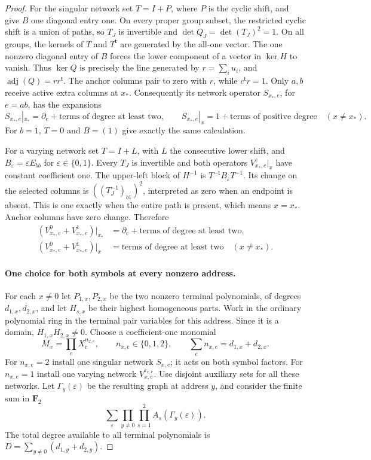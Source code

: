 \documentclass[11pt]{article}
\theoremstyle{definition}
\theoremstyle{remark}
\begin{document}
\begin{proof}
For the singular network set $T=I+P$, where $P$ is the cyclic shift,
and give $B$ one diagonal entry one.  On every proper group subset,
the restricted cyclic shift is a union of paths, so $T_J$ is
invertible and $\det Q_J=\det(T_J)^2=1$.  On all groups, the kernels
of $T$ and $T^{\mathsf t}$ are generated by the all-one vector.
The one nonzero diagonal entry of $B$ forces the lower component of
a vector in $\ker H$ to vanish.  Thus $\ker Q$ is precisely the line
generated by $r=\sum_i u_i$, and
$\operatorname{adj}(Q)=rr^{\mathsf t}$.  The anchor columns pair
to zero with $r$, while $c^{\mathsf t}r=1$.  Only $a,b$ receive
active extra columns at $x_*$.  Consequently its network operator
$S_{x_*,e}$, for $e=ab$, has the expansions
\[
 S_{x_*,e}|_{x_*}=\partial_e+\text{terms of degree at least two},
 \qquad
 S_{x_*,e}|_x=1+\text{terms of positive degree}\quad(x\ne x_*).
\]
For $b=1$, $T=0$ and $B=(1)$ give exactly the same calculation.

For a varying network set $T=I+L$, with $L$ the consecutive lower
shift, and $B_\varepsilon=\varepsilon E_{bb}$ for
$\varepsilon\in\{0,1\}$.  Every $T_J$ is invertible and both
operators $V^\varepsilon_{x_*,e}|_x$ have constant coefficient one.
The upper-left block of $H^{-1}$ is
$T^{-\mathsf t}B_\varepsilon T^{-1}$.  Its change on the selected
columns is $((T_J^{-1})_{b1})^2$, interpreted as zero when an endpoint
is absent.  This is one exactly when the entire path is present,
which means $x=x_*$.  Anchor columns have zero change.  Therefore
\[
 \begin{aligned}
 (V^0_{x_*,e}+V^1_{x_*,e})|_{x_*}
       &=\partial_e+\text{terms of degree at least two},\\
 (V^0_{x_*,e}+V^1_{x_*,e})|_x
       &=\text{terms of degree at least two}\quad(x\ne x_*).
 \end{aligned}
\]

\paragraph{One choice for both symbols at every nonzero address.}
For each $x\ne0$ let $P_{1,x},P_{2,x}$ be the two nonzero terminal
polynomials, of degrees $d_{1,x},d_{2,x}$, and let $H_{s,x}$ be their
highest homogeneous parts.  Work in the ordinary polynomial ring
in the terminal pair variables for this address.  Since it is a
domain, $H_{1,x}H_{2,x}\ne0$.  Choose a coefficient-one monomial
\[
 M_x=\prod_e X_e^{n_{x,e}},\qquad n_{x,e}\in\{0,1,2\},\qquad
 \sum_e n_{x,e}=d_{1,x}+d_{2,x}.
\]
For $n_{x,e}=2$ install one singular network $S_{x,e}$; it acts on
both symbol factors.  For $n_{x,e}=1$ install one varying network
$V^{\varepsilon_{x,e}}_{x,e}$.  Use disjoint auxiliary sets for all
these networks.  Let $\Gamma_y(\varepsilon)$ be the resulting graph
at address $y$, and consider the finite sum in $\mathbf F_2$
\[
 \sum_{\varepsilon}
       \prod_{y\ne0}\prod_{s=1}^2 A_s(\Gamma_y(\varepsilon)).
                                                               \tag{G.1a}
\]
The total degree available to all terminal polynomials is
$D=\sum_{y\ne0}(d_{1,y}+d_{2,y})$.


\end{proof}
\end{document}
